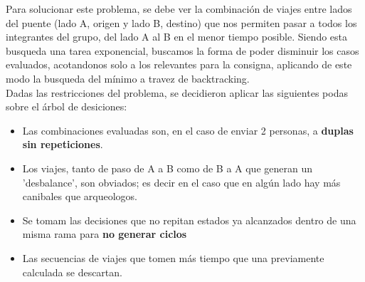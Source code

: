 Para solucionar este problema, se debe ver la combinaci\'on de viajes entre lados del puente (lado A, origen y lado B, destino) que nos permiten pasar a todos los integrantes
del grupo, del lado A al B en el menor tiempo posible. Siendo esta busqueda una tarea exponencial, buscamos la forma de poder disminuir los casos evaluados, acotandonos solo a los relevantes
para la consigna, aplicando de este modo la busqueda del m\'inimo a travez de backtracking.\\

Dadas las restricciones del problema, se decidieron aplicar las siguientes podas sobre el árbol de desiciones:
\begin{itemize}
	\item Las combinaciones evaluadas son, en el caso de enviar 2 personas, a {\bf duplas sin repeticiones}.
	\item Los viajes, tanto de paso de A a B como de B a A que generan un 'desbalance', son obviados; es decir en el caso que en alg\'un lado hay más canibales que arqueologos.
	
	\item Se tomam las decisiones que no repitan estados ya alcanzados dentro de una misma rama para {\bf no generar  ciclos}
	\item Las secuencias de viajes que tomen más tiempo que una previamente calculada se descartan.
\end{itemize}
